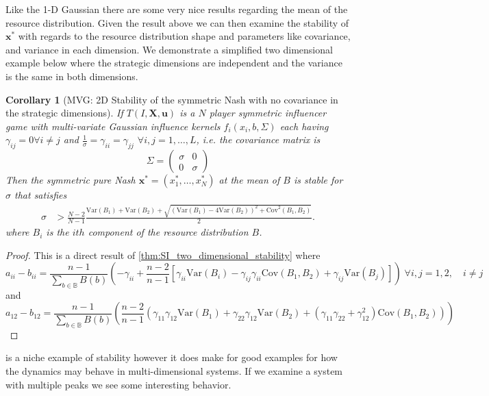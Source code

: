 \documentclass{article}
\newtheorem{corollary}{Corollary}[theorem]
\newcommand {\B}{\mathbb{B}}
\begin{document}
            Like the 1-D Gaussian there are some very nice results regarding the mean of the resource distribution. Given the result above we can then examine the stability of $\mathbf{x}^{*}$ with regards to the resource distribution shape and parameters like covariance, and variance in each dimension. We demonstrate a simplified two dimensional example below where the strategic dimensions are independent and the variance is the same in both dimensions.  
            \begin{corollary}[MVG: 2D Stability of the symmetric Nash with no covariance in the strategic dimensions]\label{cor:SI_mvg_stability}
                If $T(I,\mathbf{X},\mathbf{u})$ is a $N$ player symmetric influencer game with multi-variate Gaussian influence kernels $f_i(x_i,b,\Sigma)$ each having $\gamma_{ij}=0 \forall i\neq j$ and $\frac{1}{\sigma}=\gamma_{ii}=\gamma_{jj}$ $\forall i,j=1,\dots, L$, i.e. the covariance matrix is 
                \begin{equation}
                 \Sigma=\begin{pmatrix}
                     \sigma &0 \\
                     0& \sigma
                 \end{pmatrix}
                \end{equation}
                Then the symmetric pure Nash $\mathbf{x}^*=(x_1^*,\dots ,x_N^*)$ at the mean of $B$ is stable for $\sigma$ that satisfies
                \begin{align}
                    \sigma &> \frac{N-2}{N-1}\frac{\text{Var}(B_1)+\text{Var}(B_2)+\sqrt{(\text{Var}(B_1)-4\text{Var}(B_2))^2+\text{Cov}^2(B_1,B_2)}}{2}.
                \end{align} 
                where $B_i$ is the $ith$ component of the resource distribution $B$. 
            \end{corollary}
            \begin{proof}
                This is a direct result of \cref{thm:SI_two_dimensional_stability} where 
                \begin{equation}
                    a_{ii}-b_{ii}=\frac{n-1}{\sum_{b\in\B}B(b)}\left(-\gamma_{ii}+\frac{n-2}{n-1}[\gamma_{ii}\text{Var}(B_i)-\gamma_{ij}\gamma_{ii}\text{Cov}(B_1,B_2)+\gamma_{ij}\text{Var}(B_j)] \right)\; \forall i,j=1,2,\quad i\neq j
                \end{equation}
                and 
                \begin{equation}
                    a_{12}-b_{12}=\frac{n-1}{\sum_{b\in\B}B(b)}\left(\frac{n-2}{n-1}\left(\gamma_{11}\gamma_{12}\text{Var}(B_1)+\gamma_{22}\gamma_{12}\text{Var}(B_2)+(\gamma_{11}\gamma_{22}+\gamma_{12}^2)\text{Cov}(B_1,B_2)\right)\right)
                \end{equation}
            \end{proof}
                 is a niche example of stability however it does make for good examples for how the dynamics may behave in multi-dimensional systems. If we examine a system with multiple peaks we see some interesting behavior. 
                
\end{document}

